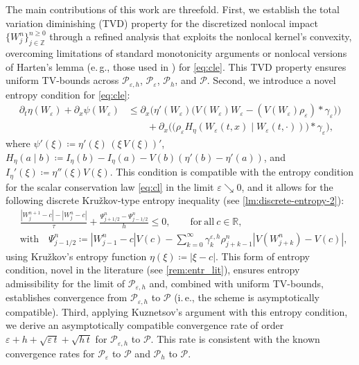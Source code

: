 \documentclass[10pt]{amsart}
\theoremstyle{plain}
\theoremstyle{definition}
\numberwithin{equation}{section}
\newcommand{\eps}{{\varepsilon}}
\newcommand{\pt}{\partial_t}
\newcommand{\px}{\partial_x }
\begin{document}
The main contributions of this work are threefold. First, we establish the total variation diminishing (TVD) property for the discretized nonlocal impact $\{W_j^n\}_{j \in \mathbb Z}^{n \ge 0}$ through a refined analysis that exploits the nonlocal kernel's convexity, overcoming limitations of standard monotonicity arguments or nonlocal versions of Harten's lemma (e.\,g., those used in \cite{du2017nonlocal,fjordholm2021second}) for \cref{eq:cle}. This TVD property ensures uniform TV-bounds across $\mathcal{P}_{\eps,h}$, $\mathcal{P}_\eps$, $\mathcal{P}_h$, and $\mathcal{P}$. Second, we introduce a novel entropy condition for \cref{eq:cle}:
\begin{align*}
 \pt \eta(W_\eps) + \partial_x \psi(W_\eps) &\le \px \big(\eta'(W_\eps)   \big(V(W_\eps)W_\eps - (V(W_\eps) \rho_\eps) \ast \gamma_\eps\big)\big) \\ & \qquad +
     \partial_x \big( \big( \rho_\eps H_\eta(W_\eps(t,x)\mid W_\eps(t,\cdot)) \big) \ast\gamma_\eps \big) ,
\end{align*}
where $\psi'(\xi)\coloneqq\eta'(\xi)\,(\xi\,V(\xi))'$, $H_\eta(a\mid b) \coloneqq  I_\eta(b) - I_\eta(a) - V(b)(\eta'(b)-\eta'(a))$, and $I_\eta'(\xi) \coloneqq  \eta''(\xi)V(\xi)$.
This condition is compatible with the entropy condition for the scalar conservation law \cref{eq:cl} in the limit $\eps\searrow0$, and it allows for the following discrete Kru\v{z}kov-type entropy inequality (see \cref{lm:discrete-entropy-2}):
\begin{align*}
    &\frac{|W_j^{n+1}-c| -|W_j^n-c|}{\tau} + \frac{\Psi_{j+1/2}^n - \Psi_{j-1/2}^n}{h} \leq 0, \qquad \mathrm{for\ all}\  c\in\mathbb{R}, \\
    &\mathrm{with} \quad \Psi_{j-1/2}^n \coloneqq |W_{j-1}^n-c|V(c) - \sum_{k=0}^\infty \gamma_k^{\eps,h} \rho_{j+k-1}^n \left|V(W_{j+k}^n)-V(c)\right|,
\end{align*}
using Kru\v{z}kov's entropy function $\eta(\xi)\coloneqq|\xi-c|$. This form of entropy condition, novel in the literature (see \cref{rem:entr_lit}), ensures entropy admissibility for the limit of $\mathcal{P}_{\eps,h}$ and, combined with uniform TV-bounds, establishes convergence from $\mathcal{P}_{\eps,h}$ to $\mathcal{P}$ (i.\,e., the scheme  is asymptotically compatible).
Third, applying Kuznetsov’s argument with this entropy condition, we derive an asymptotically compatible convergence rate of order $\eps + h + \sqrt{\eps\,t} + \sqrt{h\,t}$ for $\mathcal{P}_{\eps,h}$ to $\mathcal{P}$. This rate is consistent with the known convergence rates for $\mathcal{P}_\eps$ to $\mathcal{P}$ and $\mathcal{P}_h$ to $\mathcal{P}$.
\end{document}
